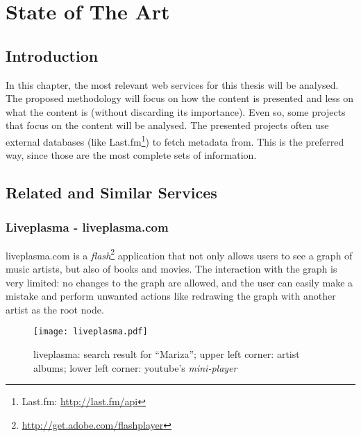 
\chapter{State of The Art} \label{chap:chap2}

\section*{}


\section{Introduction}

In this chapter, the most relevant web services for this thesis will be analysed.
The proposed methodology will focus on how the content is presented and less on what the content is (without discarding its importance).
Even so, some projects that focus on the content will be analysed.
The presented projects often use external databases (like Last.fm\footnote{Last.fm: \url{http://last.fm/api}}) to fetch metadata from.
This is the preferred way, since those are the most complete sets of information. 

\section{Related and Similar Services} %
\label{sec:related_similar_services}

  \subsection{Liveplasma - liveplasma.com} %
  \label{sub:liveplasma}

    liveplasma.com is a \emph{flash}\footnote{\url{http://get.adobe.com/flashplayer}} application that not only allows users to see a graph of music artists, but also of books and movies.
    The interaction with the graph is very limited: no changes to the graph are allowed, and the user can easily make a mistake and perform unwanted actions like redrawing the graph with another artist as the root node.

    \begin{figure}
      \begin{center}
        \texttt{[image: liveplasma.pdf]}
      \end{center}
      \caption{liveplasma: search result for ``Mariza''; upper left corner: artist albums; lower left corner: youtube's \emph{mini-player}}
      \label{fig:sota_liveplasma}
    \end{figure}


